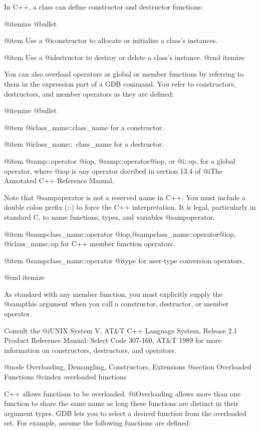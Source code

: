In C++, a class can define constructor and destructor functions:

@itemize @bullet

@item
Use a @i{constructor} to allocate or initialize a class's instances.

@item
Use a @i{destructor} to destroy or delete a class's instance. 
@end itemize

You can also overload operators as global or member functions by
referring to them in the expression part of a GDB command. You refer
to constructors, destructors, and member operators as they are
defined:

@itemize @bullet

@item
@i{class_name::class_name} for a constructor.

@item
@i{class_name::~class_name} for a destructor. 

@item
@samp{::operator} @i{op}, @samp{::operator}@i{op}, or @i{::op}, for a
global operator, where @i{op} is any operator decribed in section 13.4
of @i{The Annotated C++ Reference Manual}.

Note that @samp{operator} is not a reserved name in C++. You must
include a double colon prefix (::) to force the C++ interpretation. It
is legal, particularly in standard C, to name functions, types, and
variables @samp{operator}.

@item
@samp{class_name::operator} @i{op},@samp{class_name::operator}@i{op}, 
@i{class_name::op} for C++ member function operators.

@item
@samp{class_name::operator} @i{type} for user-type conversion
operators.  

@end itemize

As standard with any member function, you must explicitly supply the
@samp{this} argument when you call a constructor, destructor, or
member operator.
 
Consult the @i{UNIX System V, AT&T C++ Language System, Release 2.1
Product Reference Manual}: Select Code 307-160, AT&T 1989 for more
information on constructors, destructors, and operators.

@node Overloading, Demangling, Constructors, Extensions
@section Overloaded Functions
@cindex overloaded functions

C++ allows functions to be overloaded. @i{Overloading} allows more
than one function to share the same name as long these functions are
distinct in their argument types. GDB lets you to select a desired
function from the overloaded set. For example, assume the following
functions are defined:

